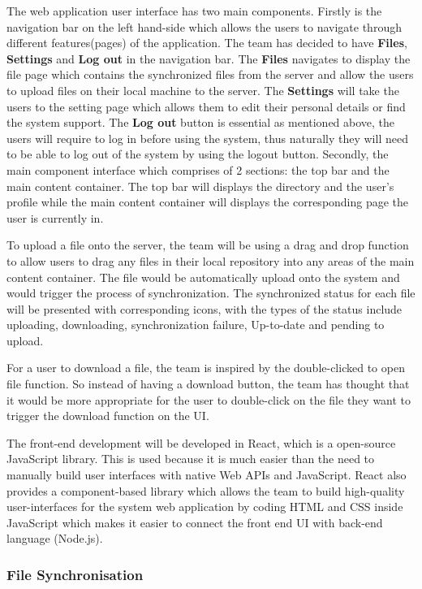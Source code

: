 \documentclass{article}
\begin{document}
The web application user interface has two main components. Firstly is the navigation bar on the left hand-side which allows the users to navigate through different features(pages) of the application. The team has decided to have \textbf{Files}, \textbf{Settings} and \textbf{Log out} in the navigation bar. The \textbf{Files} navigates to display the file page which contains the synchronized files from the server and allow the users to upload files on their local machine to the server. The \textbf{Settings} will take the users to the setting page which allows them to edit their personal details or find the system support. The \textbf{Log out} button is essential as mentioned above, the users will require to log in before using the system, thus naturally they will need to be able to log out of the system by using the logout button.
Secondly, the main component interface which comprises of 2 sections: the top bar and the main content container. The top bar will displays the directory and the user's profile while the main content container will displays the corresponding page the user is currently in.

To upload a file onto the server, the team will be using a drag and drop function to allow users to drag any files in their local repository into any areas of the main content container. The file would be automatically upload onto the system and would trigger the process of synchronization. The synchronized status for each file will be presented with corresponding icons, with the types of the status include uploading, downloading, synchronization failure, Up-to-date and pending to upload.

For a user to download a file, the team is inspired by the double-clicked to open file function. So instead of having a download button, the team has thought that it would be more appropriate for the user to double-click on the file they want to trigger the download function on the UI.

The front-end development will be developed in React, which is a open-source JavaScript library. This is used because it is much easier than the need to manually build user interfaces with native Web APIs and JavaScript. React also provides a component-based library which allows the team to build high-quality user-interfaces for the system web application by coding HTML and CSS inside JavaScript which makes it easier to connect the front end UI with back-end language (Node.js).

\subsubsection{File Synchronisation}
\end{document}
